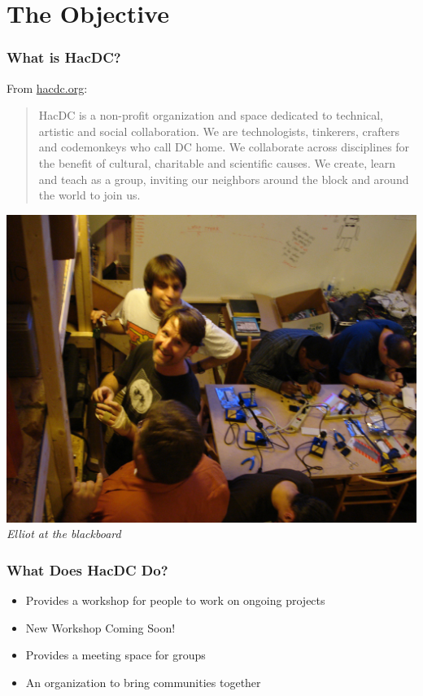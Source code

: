 \documentclass[notes]{beamer}
\begin{document}
\section{The Objective}

\begin{frame}
  \frametitle{What is HacDC?}
  From \href{http://www.hacdc.org}{hacdc.org}:
  \begin{quote}
        HacDC is a non-profit organization and space dedicated to
        technical, artistic and social collaboration. We are
        technologists, tinkerers, crafters and codemonkeys who call DC
        home. We collaborate across disciplines for the benefit of
        cultural, charitable and scientific causes. We create, learn and
        teach as a group, inviting our neighbors around the block and
        around the world to join us.
      \end{quote}
  \end{frame}

  \begin{frame}
    \begin{center}
    \includegraphics[height=.8\textheight]{elliot-teaching.jpg}\\
    {\small{\em Elliot at the blackboard}}
  \end{center}
\end{frame}

\begin{frame}
  \frametitle{What Does HacDC Do?}
  \begin{itemize}
  \item Provides a workshop for people to work on ongoing projects
  \item New Workshop Coming Soon!
  \item Provides a meeting space for groups
  \item An organization to bring communities together
  \end{itemize}
\end{frame}
\end{document}
